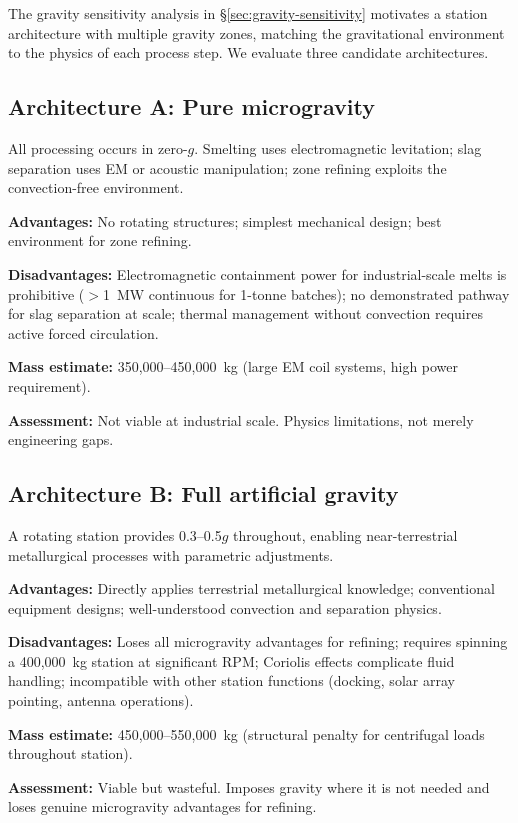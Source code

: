 \documentclass[preprint,12pt]{elsarticle}
\begin{document}
The gravity sensitivity analysis in \S\ref{sec:gravity-sensitivity} motivates a station architecture with multiple gravity zones, matching the gravitational environment to the physics of each process step. We evaluate three candidate architectures.

\subsection{Architecture A: Pure microgravity}

All processing occurs in zero-$g$. Smelting uses electromagnetic levitation; slag separation uses EM or acoustic manipulation; zone refining exploits the convection-free environment.

\textbf{Advantages:} No rotating structures; simplest mechanical design; best environment for zone refining.

\textbf{Disadvantages:} Electromagnetic containment power for industrial-scale melts is prohibitive ($>$1~MW continuous for 1-tonne batches); no demonstrated pathway for slag separation at scale; thermal management without convection requires active forced circulation.

\textbf{Mass estimate:} 350,000--450,000~kg (large EM coil systems, high power requirement).

\textbf{Assessment:} Not viable at industrial scale. Physics limitations, not merely engineering gaps.

\subsection{Architecture B: Full artificial gravity}

A rotating station provides 0.3--0.5$g$ throughout, enabling near-terrestrial metallurgical processes with parametric adjustments.

\textbf{Advantages:} Directly applies terrestrial metallurgical knowledge; conventional equipment designs; well-understood convection and separation physics.

\textbf{Disadvantages:} Loses all microgravity advantages for refining; requires spinning a 400,000~kg station at significant RPM; Coriolis effects complicate fluid handling; incompatible with other station functions (docking, solar array pointing, antenna operations).

\textbf{Mass estimate:} 450,000--550,000~kg (structural penalty for centrifugal loads throughout station).

\textbf{Assessment:} Viable but wasteful. Imposes gravity where it is not needed and loses genuine microgravity advantages for refining.
\end{document}
